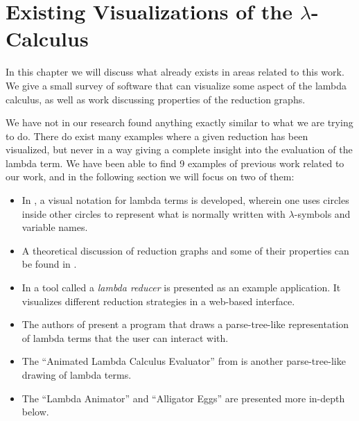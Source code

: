 
\chapter{Existing Visualizations of the $\lambda$-Calculus}

In this chapter we will discuss what already exists in areas related to this
work. We give a small survey of software that can visualize some aspect of the
lambda calculus, as well as work discussing properties of the reduction
graphs.

We have not in our research found anything exactly similar to what we are
trying to do. There do exist many examples where a given reduction has been
visualized, but never in a way giving a complete insight into the evaluation
of the lambda term. We have been able to find 9 examples of previous work
related to our work, and in the following section we will focus on two of
them:
\begin{itemize}
	\item In \cite{Citrin+Hall+Zorn+1995a}, a visual notation for lambda terms 
	is developed, wherein one uses circles inside other circles to represent
	what is normally written with $\lambda$-symbols and variable names.
	
	\item A theoretical discussion of reduction graphs and some of their properties
	can be found in \cite{VenturiniZilli1984251,297368}. 
	
	\item In \cite{Sestoft96standardml} a tool called a \emph{lambda reducer} is 
	presented as an example application. It visualizes different reduction 
	strategies in a web-based interface.
	
	\item The authors of \cite{DBLP:journals/entcs/RuizV09} present a program
	that draws a parse-tree-like representation of lambda terms that the user can interact
	with. 
	
	\item The ``Animated Lambda Calculus Evaluator'' from \cite{AnimatedLambdaCalculusEvaluator}
	is another parse-tree-like drawing of lambda terms.
	
	\item The ``Lambda Animator'' \cite{lambdaAnimatorThyer} and ``Alligator Eggs'' \cite{Alligator}
	are presented more in-depth below.
	
\end{itemize}

